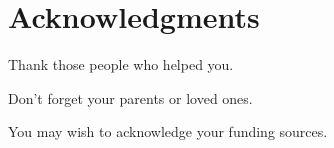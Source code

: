 \chapter{Acknowledgments}

Thank those people who helped you. 

Don't forget your parents or loved ones.

You may wish to acknowledge your funding sources.
